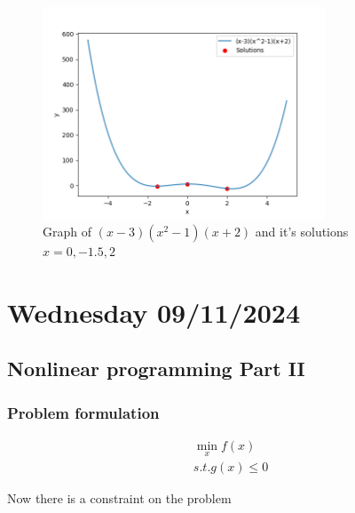 \begin{figure}[htbp]
  \centerline{\includegraphics[width=0.75\textwidth]{images/gradient_ex4.png}}
  \caption{Graph of $(x-3)(x^2-1)(x+2)$ and it's solutions $x = 0,-1.5,2$}
  \label{fig:gradient_ex4}
\end{figure}

\section{Wednesday 09/11/2024}
\subsection{Nonlinear programming Part II}
\subsubsection{Problem formulation}

\begin{equation}
  \begin{aligned}
    \min_x f(x) \\
    s.t. g(x) \leq 0
  \end{aligned}
\end{equation}

Now there is a constraint on the problem

